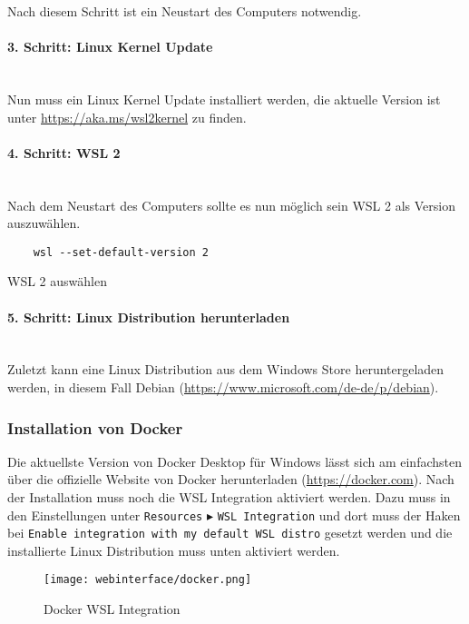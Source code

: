 Nach diesem Schritt ist ein Neustart des Computers notwendig.

\paragraph{3. Schritt: Linux Kernel Update}\mbox{}\\
Nun muss ein Linux Kernel Update installiert werden, die aktuelle Version ist
unter \url{https://aka.ms/wsl2kernel} zu finden.

\paragraph{4. Schritt: WSL 2}\mbox{}\\
Nach dem Neustart des Computers sollte es nun möglich sein WSL 2 als Version
auszuwählen.
\begin{listing}[H]
  \begin{verbatim}
    wsl --set-default-version 2
  \end{verbatim}
  \caption{WSL 2 auswählen}
\end{listing}

\paragraph{5. Schritt: Linux Distribution herunterladen}\mbox{}\\
Zuletzt kann eine Linux Distribution aus dem Windows Store heruntergeladen
werden, in diesem Fall Debian (\url{https://www.microsoft.com/de-de/p/debian}).


\subsubsection{Installation von Docker}
Die aktuellste Version von Docker Desktop für Windows lässt sich am einfachsten
über die offizielle Website von Docker herunterladen (\url{https://docker.com}).
Nach der Installation muss noch die WSL Integration aktiviert werden. Dazu muss
in den Einstellungen unter \verb|Resources| $\blacktriangleright$ \verb|WSL Integration| und
dort muss der Haken bei \verb|Enable integration with my default WSL distro| gesetzt
werden und die installierte Linux Distribution muss unten aktiviert werden.

\begin{figure}[H]
  \centering
  \texttt{[image: webinterface/docker.png]}
  \caption{Docker WSL Integration}
\end{figure}

